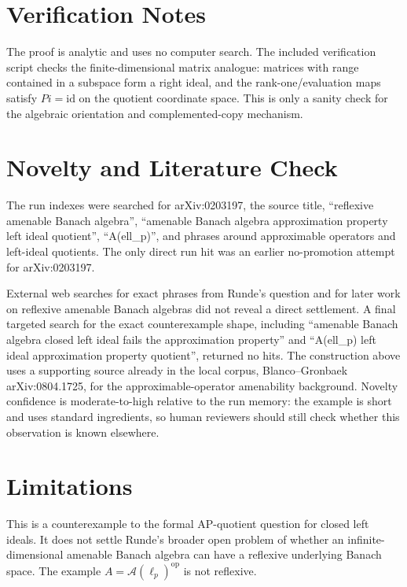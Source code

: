 \documentclass[11pt]{article}
\newcommand{\A}{\mathcal A}
\newcommand{\op}{\mathrm{op}}
\begin{document}
\section*{Verification Notes}

The proof is analytic and uses no computer search. The included verification
script checks the finite-dimensional matrix analogue: matrices with range
contained in a subspace form a right ideal, and the rank-one/evaluation maps
satisfy \(Pi=\mathrm{id}\) on the quotient coordinate space. This is only a
sanity check for the algebraic orientation and complemented-copy mechanism.

\section*{Novelty and Literature Check}

The run indexes were searched for arXiv:0203197, the source title,
``reflexive amenable Banach algebra'', ``amenable Banach algebra approximation
property left ideal quotient'', ``A(ell\_p)'', and phrases around approximable
operators and left-ideal quotients. The only direct run hit was an earlier
no-promotion attempt for arXiv:0203197.

External web searches for exact phrases from Runde's question and for later
work on reflexive amenable Banach algebras did not reveal a direct settlement.
A final targeted search for the exact counterexample shape, including
``amenable Banach algebra closed left ideal fails the approximation property''
and ``A(ell\_p) left ideal approximation property quotient'', returned no hits.
The construction above uses a supporting source already in the local corpus,
Blanco--Gronbaek arXiv:0804.1725, for the approximable-operator amenability
background. Novelty confidence is moderate-to-high relative to the run memory:
the example is short and uses standard ingredients, so human reviewers should
still check whether this observation is known elsewhere.

\section*{Limitations}

This is a counterexample to the formal AP-quotient question for closed left
ideals. It does not settle Runde's broader open problem of whether an
infinite-dimensional amenable Banach algebra can have a reflexive underlying
Banach space. The example \(A=\A(\ell_p)^{\op}\) is not reflexive.
\end{document}
